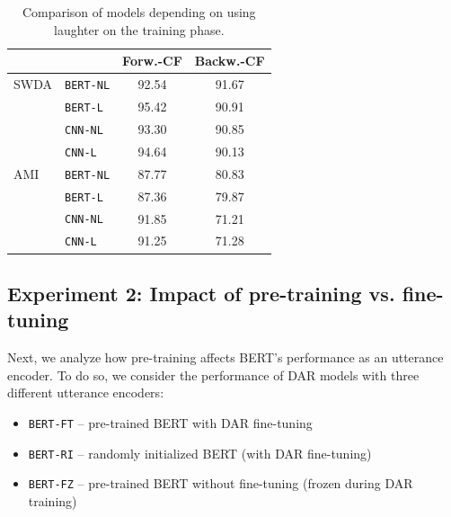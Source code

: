 \documentclass[11pt,a4paper]{article}
\begin{document}
\begin{table}
  \centering
  \begin{tabular}{@{}llcc@{}}
    \toprule
    &                  & Forw.-CF  & Backw.-CF   \\ \midrule
    SWDA &\texttt{BERT-NL}  & 92.54 & 91.67       \\ 
         &\texttt{BERT-L}   & 95.42 & 90.91       \\ 
         &\texttt{CNN-NL}   & 93.30 & 90.85        \\
         &\texttt{CNN-L}    & 94.64 & 90.13        \\ \midrule
    AMI  &\texttt{BERT-NL}  & 87.77 & 80.83       \\ 
         &\texttt{BERT-L}   & 87.36 & 79.87       \\
         &\texttt{CNN-NL}   & 91.85 & 71.21        \\
         &\texttt{CNN-L}    & 91.25 & 71.28        \\    \bottomrule
  \end{tabular}
  \caption{Comparison of models depending on using laughter on the training phase. }
  \label{table:laughter-group-acc}
\end{table}



  

%

\subsection{Experiment 2: Impact of pre-training vs. fine-tuning} \label{sec:experiment2} %
Next, we analyze how pre-training affects BERT's performance as an utterance encoder.
To do so, we consider the performance of DAR models with three different utterance encoders:
\begin{itemize}
  \item \texttt{BERT-FT} -- pre-trained BERT with DAR fine-tuning 
  \item \texttt{BERT-RI} -- randomly initialized BERT (with DAR fine-tuning)
  \item \texttt{BERT-FZ} -- pre-trained BERT without fine-tuning (frozen during DAR training)
\end{itemize}
\end{document}

